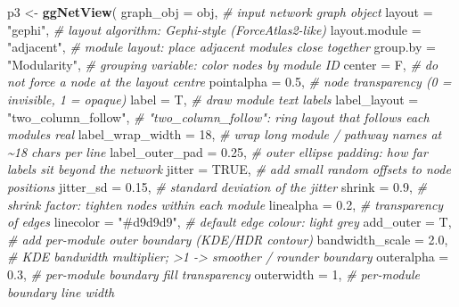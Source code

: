 \documentclass[
]{book}
\newenvironment{Shaded}{\begin{snugshade}}{\end{snugshade}}
\newcommand{\AttributeTok}[1]{\textcolor[rgb]{0.13,0.29,0.53}{#1}}
\newcommand{\CommentTok}[1]{\textcolor[rgb]{0.56,0.35,0.01}{\textit{#1}}}
\newcommand{\ConstantTok}[1]{\textcolor[rgb]{0.56,0.35,0.01}{#1}}
\newcommand{\DecValTok}[1]{\textcolor[rgb]{0.00,0.00,0.81}{#1}}
\newcommand{\FloatTok}[1]{\textcolor[rgb]{0.00,0.00,0.81}{#1}}
\newcommand{\FunctionTok}[1]{\textcolor[rgb]{0.13,0.29,0.53}{\textbf{#1}}}
\newcommand{\NormalTok}[1]{#1}
\newcommand{\OtherTok}[1]{\textcolor[rgb]{0.56,0.35,0.01}{#1}}
\newcommand{\StringTok}[1]{\textcolor[rgb]{0.31,0.60,0.02}{#1}}
\begin{document}
\begin{Shaded}
\begin{Highlighting}[]
\NormalTok{p3 }\OtherTok{\textless{}{-}} \FunctionTok{ggNetView}\NormalTok{(}
  \AttributeTok{graph\_obj        =}\NormalTok{ obj,             }\CommentTok{\# input network graph object}
  \AttributeTok{layout           =} \StringTok{"gephi"}\NormalTok{,         }\CommentTok{\# layout algorithm: Gephi{-}style (ForceAtlas2{-}like)}
  \AttributeTok{layout.module    =} \StringTok{"adjacent"}\NormalTok{,      }\CommentTok{\# module layout: place adjacent modules close together}
  \AttributeTok{group.by         =} \StringTok{"Modularity"}\NormalTok{,    }\CommentTok{\# grouping variable: color nodes by module ID}
  \AttributeTok{center           =}\NormalTok{ F,               }\CommentTok{\# do not force a node at the layout centre}
  \AttributeTok{pointalpha       =} \FloatTok{0.5}\NormalTok{,             }\CommentTok{\# node transparency (0 = invisible, 1 = opaque)}
  \AttributeTok{label            =}\NormalTok{ T,               }\CommentTok{\# draw module text labels}
  \AttributeTok{label\_layout     =} \StringTok{"two\_column\_follow"}\NormalTok{, }\CommentTok{\# "two\_column\_follow": ring layout that follows each module\textquotesingle{}s real}
  \AttributeTok{label\_wrap\_width =} \DecValTok{18}\NormalTok{,              }\CommentTok{\# wrap long module / pathway names at \textasciitilde{}18 chars per line}
  \AttributeTok{label\_outer\_pad  =} \FloatTok{0.25}\NormalTok{,            }\CommentTok{\# outer ellipse padding: how far labels sit beyond the network}
  \AttributeTok{jitter           =} \ConstantTok{TRUE}\NormalTok{,            }\CommentTok{\# add small random offsets to node positions}
  \AttributeTok{jitter\_sd        =} \FloatTok{0.15}\NormalTok{,            }\CommentTok{\# standard deviation of the jitter}
  \AttributeTok{shrink           =} \FloatTok{0.9}\NormalTok{,             }\CommentTok{\# shrink factor: tighten nodes within each module}
  \AttributeTok{linealpha        =} \FloatTok{0.2}\NormalTok{,             }\CommentTok{\# transparency of edges}
  \AttributeTok{linecolor        =} \StringTok{"\#d9d9d9"}\NormalTok{,       }\CommentTok{\# default edge colour: light grey}
  \AttributeTok{add\_outer        =}\NormalTok{ T,               }\CommentTok{\# add per{-}module outer boundary (KDE/HDR contour)}
  \AttributeTok{bandwidth\_scale  =} \FloatTok{2.0}\NormalTok{,             }\CommentTok{\# KDE bandwidth multiplier; \textgreater{}1 {-}\textgreater{} smoother / rounder boundary}
  \AttributeTok{outeralpha       =} \FloatTok{0.3}\NormalTok{,             }\CommentTok{\# per{-}module boundary fill transparency}
  \AttributeTok{outerwidth       =} \DecValTok{1}\NormalTok{,               }\CommentTok{\# per{-}module boundary line width}

\end{Highlighting}
\end{Shaded}
\end{document}
